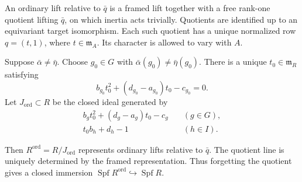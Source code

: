 An ordinary lift relative to $\bar q$ is a framed lift together with
a free rank-one quotient lifting $\bar q$, on which inertia acts
trivially. Quotients are identified up to an equivariant target
isomorphism. Each such quotient has a unique normalized row
$q=(t,1)$, where $t\in\mathfrak m_A$.
Its character is allowed to vary with $A$.

\begin{proposition}
\label{v4-arith:ic:ordinary-local:equations}
Suppose $\bar\alpha\ne\bar\eta$. Choose $g_0\in G$ with
$\bar\alpha(g_0)\ne\bar\eta(g_0)$.
There is a unique $t_0\in\mathfrak m_R$ satisfying
\begin{equation}
\label{v4-arith:ic:ordinary-local:hensel}
 b_{g_0}t_0^2+(d_{g_0}-a_{g_0})t_0-c_{g_0}=0.
\end{equation}
Let $J_{\mathrm{ord}}\subset R$ be the closed ideal generated by
\[
 \begin{split}
 b_gt_0^2+(d_g-a_g)t_0-c_g&\quad(g\in G),\\
 t_0b_h+d_h-1&\quad(h\in I).
 \end{split}
\]

Then $R^{\mathrm{ord}}=R/J_{\mathrm{ord}}$ represents ordinary
lifts relative to $\bar q$. The quotient line is uniquely determined
by the framed representation. Thus forgetting the quotient gives
a closed immersion
$\operatorname{Spf}R^{\mathrm{ord}}\hookrightarrow\operatorname{Spf}R$.
\end{proposition}

